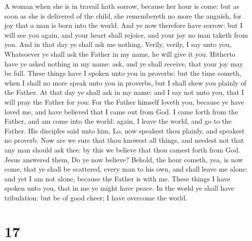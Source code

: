  A woman when she is in travail hath sorrow, because her
hour is come: but as soon as she is delivered of the child, she
remembereth no more the anguish, for joy that a man is born into the
world.  And ye now therefore have sorrow: but I will see
you again, and your heart shall rejoice, and your joy no man taketh from
you.  And in that day ye shall ask me nothing. Verily,
verily, I say unto you, Whatsoever ye shall ask the Father in my name,
he will give it you.  Hitherto have ye asked nothing in
my name: ask, and ye shall receive, that your joy may be full.
 These things have I spoken unto you in proverbs: but the
time cometh, when I shall no more speak unto you in proverbs, but I
shall shew you plainly of the Father.  At that day ye
shall ask in my name: and I say not unto you, that I will pray the
Father for you:  For the Father himself loveth you,
because ye have loved me, and have believed that I came out from God.
 I came forth from the Father, and am come into the
world: again, I leave the world, and go to the Father. 
His disciples said unto him, Lo, now speakest thou plainly, and speakest
no proverb.  Now are we sure that thou knowest all
things, and needest not that any man should ask thee: by this we believe
that thou camest forth from God.  Jesus answered them, Do
ye now believe?  Behold, the hour cometh, yea, is now
come, that ye shall be scattered, every man to his own, and shall leave
me alone: and yet I am not alone, because the Father is with me.
 These things I have spoken unto you, that in me ye might
have peace. In the world ye shall have tribulation: but be of good
cheer; I have overcome the world.

\hypertarget{section-16}{%
\section{17}\label{section-16}}


